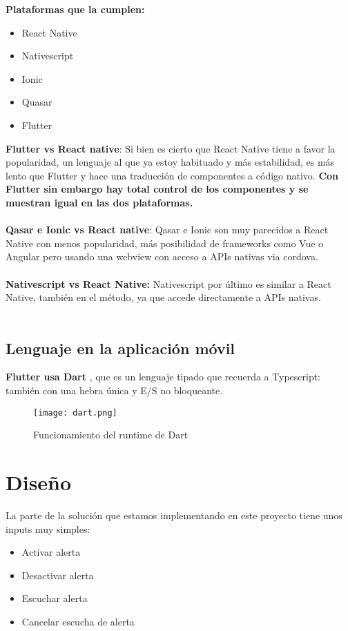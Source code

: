 \textbf{Plataformas que la cumplen: }
\begin{itemize}
  \item React Native \cite{reactnative}
  \item Nativescript \cite{nativescript}
  \item Ionic \cite{ionic}
  \item Quasar \cite{Quasar}
  \item Flutter \cite{flutter}
\end{itemize}

\textbf{Flutter vs React native}: Si bien es cierto que React Native tiene a favor la popularidad, un lenguaje al que ya estoy habituado y más estabilidad, es más lento que Flutter y hace una traducción de componentes a código nativo.
\textbf{Con Flutter sin embargo hay total control de los componentes y se muestran igual en las dos plataformas.} \\ \\

\textbf{Qasar e Ionic vs React native}: Qasar e Ionic son muy parecidos a React Native con menos popularidad, más posibilidad de frameworks como Vue o Angular pero usando 
una webview con acceso a APIs nativas via cordova. \\ \\

\textbf{Nativescript vs React Native:} Nativescript por último es similar a React Native, también en el método, ya que accede directamente a APIs nativas. \\ \\

\subsection{Lenguaje en la aplicación móvil}
\textbf{Flutter usa Dart} \cite{dart}, que es un lenguaje tipado que recuerda a Typescript: también con una hebra única y E/S no bloqueante.

\begin{figure}[H]
	\centering	
	\texttt{[image: dart.png]}
	\caption{Funcionamiento del runtime de Dart}
	\end{figure}

\section{Diseño}
La parte de la solución que estamos implementando en este proyecto tiene unos inputs muy simples:
\begin{itemize}
	\item Activar alerta
	\item Desactivar alerta
	\item Escuchar alerta
	\item Cancelar escucha de alerta
\end{itemize}

